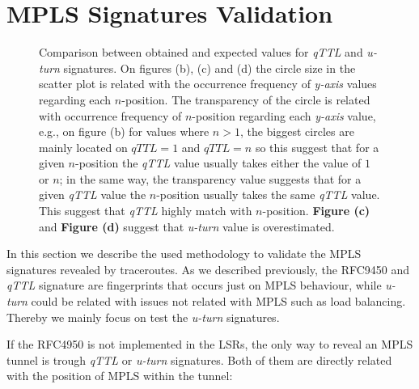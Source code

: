 \section{MPLS Signatures Validation}\label{validation}

\begin{figure*}[!ht]
  \begin{center}
      \hfil
      \hfil
      \hfil
  \end{center}
  \caption{ Comparison between obtained and expected values for \textit{qTTL} and
  \textit{u-turn} signatures. On figures (b), (c) and (d) the circle size in the scatter plot is related with the occurrence frequency of \textit{y-axis} values regarding each $n$-position. The
  transparency of the circle is related with occurrence frequency of $n$-position  regarding each \textit{y-axis} value, e.g., on figure (b) for values where $n>1$, the biggest circles are mainly located on  $\textit{qTTL}=1$ and $\textit{qTTL}=n$ so this suggest that for a given $n$-position the \textit{qTTL} value usually takes either the value of $1$ or $n$; in the same way, the transparency value suggests that for a given \textit{qTTL} value the $n$-position usually takes the same \textit{qTTL} value. This suggest that \textit{qTTL} highly match with $n$-position.  \textbf{Figure (c)} and \textbf{Figure (d)} suggest that \textit{u-turn} value is overestimated. }
  \label{ig_signatures}
\end{figure*}

In this section we describe the used methodology to validate the MPLS signatures
revealed by traceroutes. As we described previously, the RFC9450 and
\textit{qTTL} signature are fingerprints that occurs just on MPLS behaviour,
while \textit{u-turn} could be related with issues not related with MPLS such as
load balancing. Thereby we mainly focus on test the \textit{u-turn} signatures.

If the RFC4950 is not implemented in the LSRs, the only way to reveal
an MPLS tunnel is trough \textit{qTTL} or \textit{u-turn} signatures. Both of
them are directly related with the position of MPLS within the tunnel:

